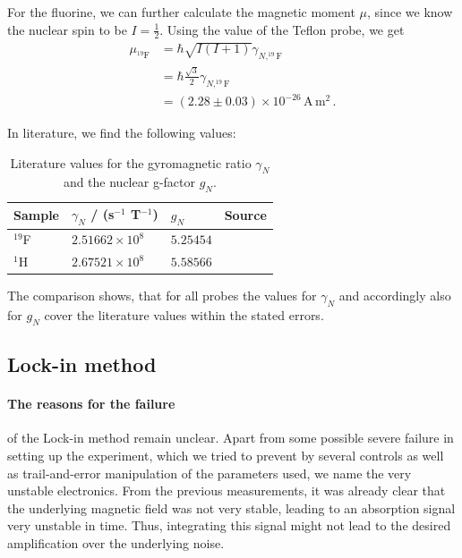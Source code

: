 For the fluorine, we can further calculate the magnetic moment $\mu$, since we know the 
nuclear spin to be $I = \frac{1}{2}$. Using the value of the Teflon probe, we get 
\begin{equation}
    \begin{split}
        \mu_{^{19}\mathrm{F}} &= \hbar \sqrt{I(I + 1)}  \gamma_{N, ^{19}\mathrm{F}} \\
            &= \hbar \frac{\sqrt{3}}{2}  \gamma_{N, ^{19}\mathrm{F}} \\
            &= \left(2.28 \pm 0.03\right) \times 10^{-26} \, \mathrm{A \, m^2}\, .
    \end{split}
\end{equation}

In literature, we find the following values:
\renewcommand{\arraystretch}{1.5}
\begin{table}[H]
\centering
\begin{tabular}{|p{3.82cm}|p{3.82cm}|p{3.82cm}|p{2.00cm}|}
        \hline
        \rowcolor{LightCyan}
        Sample & $\gamma_N$ / (s$^{-1}$ T$^{-1}$) & $g_N$ & Source\\ \hline
        $^{19}$F    & $ 2.51662 \times 10^{8}$  & $ 5.25454$ & \cite{nist}\\ 
        $^1$H       & $ 2.67521 \times 10^{8}$  & $ 5.58566$ & \cite{crc}\\
        \hline
    \end{tabular}
    \caption{
        Literature values for the gyromagnetic ratio $\gamma_N$ and the nuclear g-factor $g_N$.
        }
    \label{tab:g_N}
\end{table}
The comparison shows, that for all probes the values for $\gamma_N$ and accordingly also for 
$g_N$ cover the literature values within the stated errors.



\subsection{Lock-in method}
\paragraph{The reasons for the failure} 
of the Lock-in method remain unclear. Apart from some possible severe 
failure in setting up the experiment, which we tried to prevent by several 
controls as well as trail-and-error manipulation of the parameters used, 
we name the very unstable electronics. From the previous measurements, it was 
already clear that the underlying magnetic field was not very stable, leading 
to an absorption signal very unstable in time. Thus, integrating this signal 
might not lead to the desired amplification over the underlying noise. 

